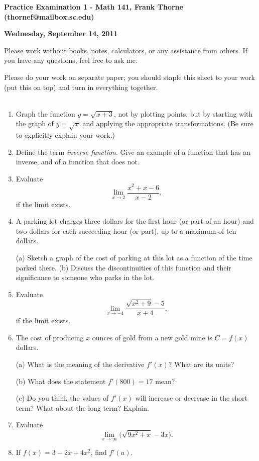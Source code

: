 \documentclass[12pt]{article}
\begin{document}
\setlength{\topmargin}{-2mm}





\begin{center}{\bf Practice Examination 1 - Math 141, Frank Thorne (thornef@mailbox.sc.edu)}
\end{center}
\begin{center}
{\bf Wednesday, September 14, 2011}
\end{center}

Please work without books, notes, calculators, or any assistance from others. If you have
any questions, feel free to ask me. 

Please do your work on separate paper; you should staple this sheet to your work (put this on top)
and turn in everything together. 
\\
\\
\begin{enumerate}[(1)]
\item
Graph the function $y = \sqrt{x + 3}$, not by plotting points, but by
starting with the graph of $y = \sqrt{x}$ and applying the appropriate transformations.
(Be sure to explicitly explain your work.)

\item
Define the term {\itshape inverse function}. Give an example of a function that
has an inverse, and of a function that does not.

\item
Evaluate $$\lim_{x \rightarrow 2} \frac{x^2 + x - 6}{x - 2},$$
if the limit exists.

\item
A parking lot charges three dollars for the first hour (or part of an hour)
and two dollars for each succeeding hour (or part), up to a maximum of ten dollars.

(a) Sketch a graph of the cost of parking at this lot as a function of the time parked
there.
(b) Discuss the discontinuities of this function and their significance to someone
who parks in the lot.

\item
Evaluate $$\lim_{x \rightarrow -4} \frac{ \sqrt{x^2 + 9} - 5}{x + 4},$$
if the limit exists.

\item
The cost of producing $x$ ounces of gold from a new gold mine is $C = f(x)$ dollars.

(a) What is the meaning of the derivative $f'(x)$? What are its units?

(b) What does the statement $f'(800) = 17$ mean?

(c) Do you think the values of $f'(x)$ will increase or decrease in the short term?
What about the long term? Explain.

\item
Evaluate
$$\lim_{x \rightarrow \infty} \bigg( \sqrt{9x^2 + x} - 3x \bigg).$$

\item
If $f(x) = 3 - 2x + 4x^2$, find $f'(a)$.

\end{enumerate}
\end{document}
